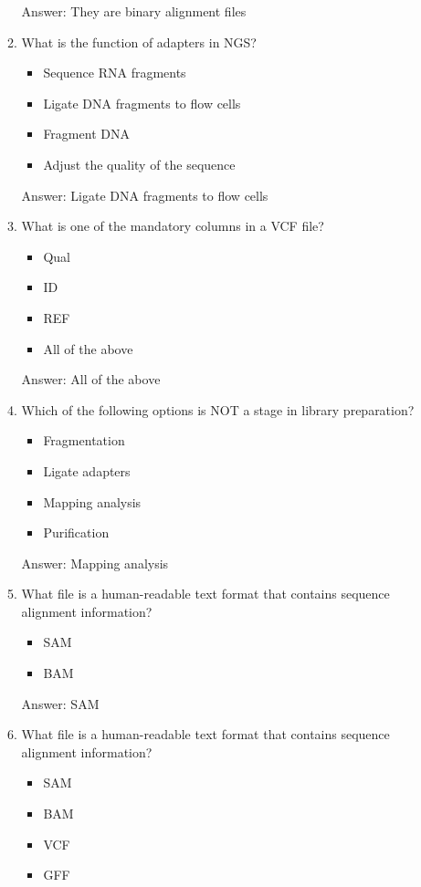 \begin{itemize}
\begin{enumerate}
Answer: They are binary alignment files

\item What is the function of adapters in NGS?
\begin{itemize}
\item Sequence RNA fragments
\item Ligate DNA fragments to flow cells
\item Fragment DNA
\item Adjust the quality of the sequence
\end{itemize}

Answer: Ligate DNA fragments to flow cells

\item What is one of the mandatory columns in a VCF file?
\begin{itemize}
\item Qual
\item ID
\item REF
\item All of the above
\end{itemize}

Answer: All of the above

\item Which of the following options is NOT a stage in library preparation?
\begin{itemize}
\item Fragmentation
\item Ligate adapters
\item Mapping analysis
\item Purification
\end{itemize}

Answer: Mapping analysis

\item What file is a human-readable text format that contains sequence alignment information?
\begin{itemize}
\item SAM
\item BAM
\end{itemize}

Answer: SAM

\item What file is a human-readable text format that contains sequence alignment information?
\begin{itemize}
\item SAM
\item BAM
\item VCF
\item GFF
\end{itemize}


\end{enumerate}
\end{itemize}

